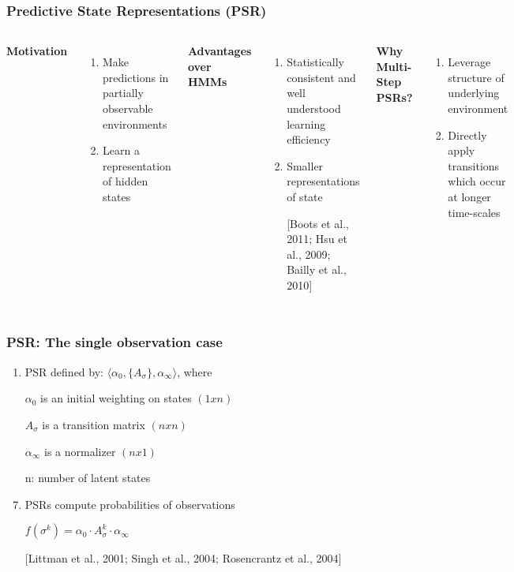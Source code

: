 \documentclass{beamer}
\begin{document}
\begin{frame}
\frametitle{Predictive State Representations (PSR)}
\begin{columns}[c] %

\textbf{Motivation}
\begin{enumerate}
\item Make predictions in partially observable environments 
\item Learn a representation of hidden states
\item[]
\end{enumerate}

\textbf{Advantages over HMMs}
\begin{enumerate}
\item Statistically consistent and well understood learning efficiency
\item Smaller representations of state
\item[] [Boots et al., 2011; Hsu et al., 2009; Bailly et al., 2010]
\item[]

\end{enumerate}

\textbf{Why Multi-Step PSRs?}
\begin{enumerate}
\item Leverage structure of underlying environment
\item Directly apply transitions which occur at longer time-scales 

\end{enumerate}

\end{columns}
\end{frame}


\begin{frame}
\frametitle{PSR: The single observation case}

\begin{enumerate}
\item PSR defined by: $\langle \alpha_0, \{A_\sigma\},\alpha_\infty \rangle$, where
\item[] $\alpha_0$ is an initial weighting on states $(1xn)$
\item[] $A_\sigma$ is a transition matrix $(nxn)$
\item[] $\alpha_\infty$ is a normalizer $(nx1)$
\item[] n: number of latent states
\item[]
\item PSRs compute probabilities of observations
\item[] $f(\sigma^k) = \alpha_0 \cdot A_\sigma^k \cdot \alpha_\infty$
\item[]
\item[] [Littman et al., 2001; Singh et al., 2004; Rosencrantz et al., 2004]

\end{enumerate}

\end{frame}
\end{document}
